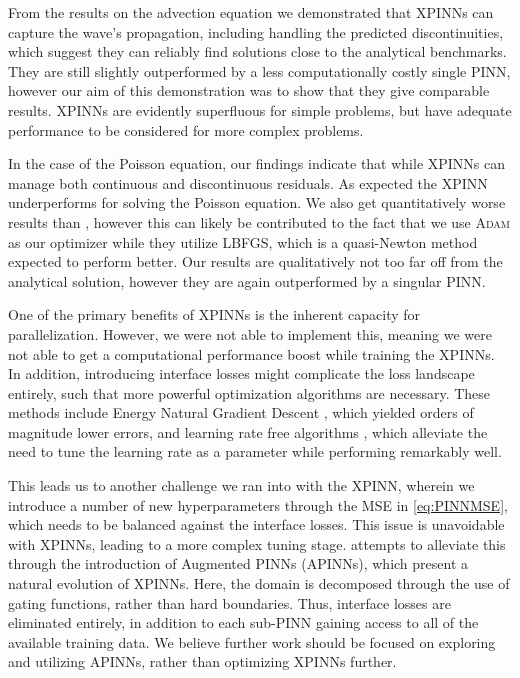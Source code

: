 From the results on the advection equation we demonstrated that XPINNs can capture the wave's propagation, including handling the predicted discontinuities, which suggest they can reliably find solutions close to the analytical benchmarks.
They are still slightly outperformed by a less computationally costly single PINN, however our aim of this demonstration was to show that they give comparable results.
XPINNs are evidently superfluous for simple problems, but have adequate performance to be considered for more complex problems.

In the case of the Poisson equation, our findings indicate that while XPINNs can manage both continuous and discontinuous residuals.
As expected the XPINN underperforms for solving the Poisson equation.
We also get quantitatively worse results than \textcite{XPINN_generalize}, however this can likely be contributed to the fact that we use \textsc{Adam} as our optimizer while they utilize LBFGS, which is a quasi-Newton method expected to perform better.
Our results are qualitatively not too far off from the analytical solution, however they are again outperformed by a singular PINN.



One of the primary benefits of XPINNs is the inherent capacity for parallelization.
However, we were not able to implement this, meaning we were not able to get a computational performance boost while training the XPINNs.
In addition, introducing interface losses might complicate the loss landscape entirely, such that more powerful optimization algorithms are necessary.
These methods include Energy Natural Gradient Descent \cite{müller2023achieving}, which yielded orders of magnitude lower errors, and learning rate free algorithms \cite{sharrock2023learning}, which alleviate the need to tune the learning rate as a parameter while performing remarkably well.

This leads us to another challenge we ran into with the XPINN, wherein we introduce a number of new hyperparameters through the MSE in \eqref{eq:PINNMSE}, which needs to be balanced against the interface losses.
This issue is unavoidable with XPINNs, leading to a more complex tuning stage.
\textcite{Hu_2023} attempts to alleviate this through the introduction of Augmented PINNs (APINNs), which present a natural evolution of XPINNs.
Here, the domain is decomposed through the use of gating functions, rather than hard boundaries.
Thus, interface losses are eliminated entirely, in addition to each sub-PINN gaining access to all of the available training data.
We believe further work should be focused on exploring and utilizing APINNs, rather than optimizing XPINNs further.

